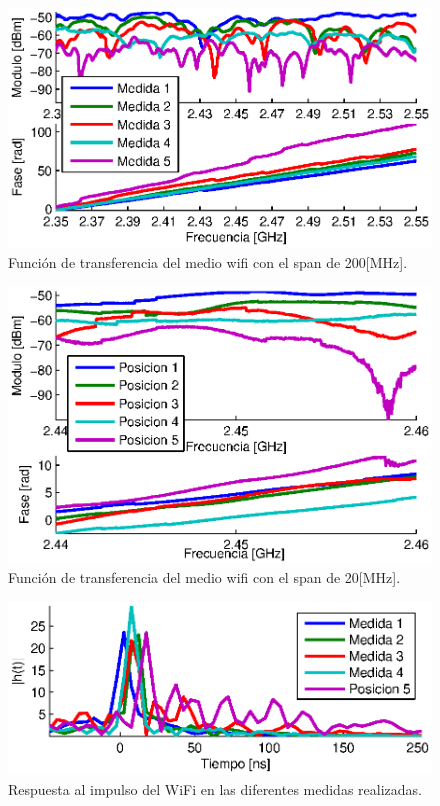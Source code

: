 \documentclass[10pt,conference,a4paper]{IEEEtran}
\begin{document}
\begin{figure}[htb]
    \centering
    \includegraphics[width=\columnwidth]{figuras/funcion_transferencia_wifi.eps}
    \caption{Función de transferencia del medio wifi con el span de 200[MHz].}
    \label{fig:transferencia_wifi}
\end{figure}
\begin{figure}[htb]
    \centering
    \includegraphics[width=\columnwidth]{figuras/funcion_transferencia_canal_wifi.eps}
    \caption{Función de transferencia del medio wifi con el span de 20[MHz].}
    \label{fig:transferencia_canal_wifi}
\end{figure}
\begin{figure}[htb]
    \centering
    \includegraphics[width=\columnwidth]{figuras/respuesta_impulso_wifi.eps}
    \caption{Respuesta al impulso del WiFi en las diferentes medidas realizadas.}
    \label{fig:respuesta_impulso_wifi}
\end{figure}
\end{document}
